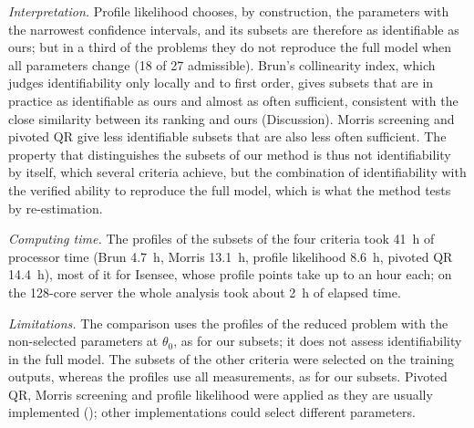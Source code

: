 \emph{Interpretation.} Profile likelihood chooses, by construction, the parameters with the narrowest confidence intervals, and its subsets are therefore as identifiable as ours; but in a third of the problems they do not reproduce the full model when all parameters change (18 of 27 admissible). Brun's collinearity index, which judges identifiability only locally and to first order, gives subsets that are in practice as identifiable as ours and almost as often sufficient, consistent with the close similarity between its ranking and ours (Discussion). Morris screening and pivoted QR give less identifiable subsets that are also less often sufficient. The property that distinguishes the subsets of our method is thus not identifiability by itself, which several criteria achieve, but the combination of identifiability with the verified ability to reproduce the full model, which is what the method tests by re-estimation.

\emph{Computing time.} The profiles of the subsets of the four criteria took 41~h of processor time (Brun 4.7~h, Morris 13.1~h, profile likelihood 8.6~h, pivoted QR 14.4~h), most of it for Isensee, whose profile points take up to an hour each; on the 128-core server the whole analysis took about 2~h of elapsed time.

\emph{Limitations.} The comparison uses the profiles of the reduced problem with the non-selected parameters at $\theta_0$, as for our subsets; it does not assess identifiability in the full model. The subsets of the other criteria were selected on the training outputs, whereas the profiles use all measurements, as for our subsets. Pivoted QR, Morris screening and profile likelihood were applied as they are usually implemented (); other implementations could select different parameters.

{\scriptsize\setlength{\tabcolsep}{3pt}

}

{\small

}
